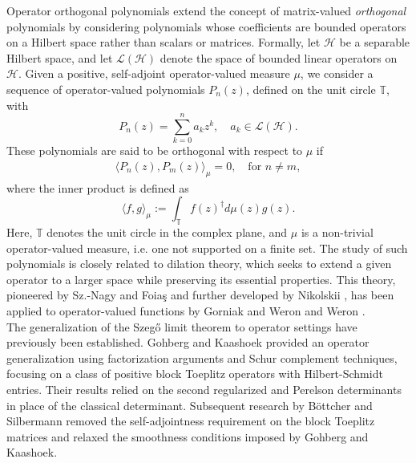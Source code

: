 \documentclass[11pt]{article}
\begin{document}
Operator orthogonal polynomials extend the concept of matrix-valued \textit{orthogonal} polynomials by considering polynomials whose coefficients are bounded operators on a Hilbert space rather than scalars or matrices. Formally, let $\mathcal{H}$ be a separable Hilbert space, and let $\mathcal{L}(\mathcal{H})$ denote the space of bounded linear operators on $\mathcal{H}$. Given a positive, self-adjoint operator-valued measure $\mu$, we consider a sequence of operator-valued polynomials $P_n(z)$, defined on the unit circle $\mathbb{T}$, with  
\[
P_n(z) = \sum_{k=0}^{n} a_k z^k, \quad a_k \in \mathcal{L}(\mathcal{H}).
\]  
These polynomials are said to be orthogonal with respect to $\mu$ if  
\begin{align*}  
\langle P_n(z), P_m(z) \rangle_{\mu} = 0, \quad \text{for } n \neq m,  
\end{align*}  
where the inner product is defined as  
\[
\langle f, g \rangle_{\mu} := \int_{\mathbb{T}} f(z)^{\dag} d\mu(z) g(z).
\]  
Here, $\mathbb{T}$ denotes the unit circle in the complex plane, and $\mu$ is a non-trivial operator-valued measure, i.e. one not supported on a finite set. The study of such polynomials is closely related to dilation theory, which seeks to extend a given operator to a larger space while preserving its essential properties. This theory, pioneered by Sz.-Nagy and Foia\c{s} \cite{SzNF} and further developed by Nikolskii \cite{Nik2}, has been applied to operator-valued functions by Gorniak and Weron \cite{GorW} and Weron \cite{Wer}.  \\

The generalization of the Szeg\H{o} limit theorem to operator settings have previously been established. Gohberg and Kaashoek \cite{GohK} provided an operator generalization using factorization arguments and Schur complement techniques, focusing on a class of positive block Toeplitz operators with Hilbert-Schmidt entries. Their results relied on the second regularized and Perelson determinants in place of the classical determinant. Subsequent research by B\"ottcher and Silbermann \cite{BotS} removed the self-adjointness requirement on the block Toeplitz matrices and relaxed the smoothness conditions imposed by Gohberg and Kaashoek. \\ 
\end{document}
